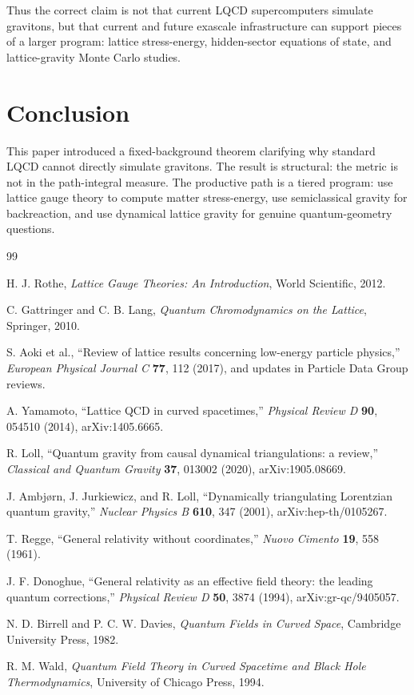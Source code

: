 \documentclass[11pt]{article}
\theoremstyle{remark}
\begin{document}
Thus the correct claim is not that current LQCD supercomputers simulate gravitons, but that current and future exascale infrastructure can support pieces of a larger program: lattice stress-energy, hidden-sector equations of state, and lattice-gravity Monte Carlo studies.

\section{Conclusion}

This paper introduced a fixed-background theorem clarifying why standard LQCD cannot directly simulate gravitons. The result is structural: the metric is not in the path-integral measure. The productive path is a tiered program: use lattice gauge theory to compute matter stress-energy, use semiclassical gravity for backreaction, and use dynamical lattice gravity for genuine quantum-geometry questions.

\begin{thebibliography}{99}

H. J. Rothe,
\textit{Lattice Gauge Theories: An Introduction}, World Scientific, 2012.

C. Gattringer and C. B. Lang,
\textit{Quantum Chromodynamics on the Lattice}, Springer, 2010.

S. Aoki et al.,
``Review of lattice results concerning low-energy particle physics,''
\textit{European Physical Journal C} \textbf{77}, 112 (2017), and updates in Particle Data Group reviews.

A. Yamamoto,
``Lattice QCD in curved spacetimes,''
\textit{Physical Review D} \textbf{90}, 054510 (2014), arXiv:1405.6665.

R. Loll,
``Quantum gravity from causal dynamical triangulations: a review,''
\textit{Classical and Quantum Gravity} \textbf{37}, 013002 (2020), arXiv:1905.08669.

J. Ambj\o rn, J. Jurkiewicz, and R. Loll,
``Dynamically triangulating Lorentzian quantum gravity,''
\textit{Nuclear Physics B} \textbf{610}, 347 (2001), arXiv:hep-th/0105267.

T. Regge,
``General relativity without coordinates,''
\textit{Nuovo Cimento} \textbf{19}, 558 (1961).

J. F. Donoghue,
``General relativity as an effective field theory: the leading quantum corrections,''
\textit{Physical Review D} \textbf{50}, 3874 (1994), arXiv:gr-qc/9405057.

N. D. Birrell and P. C. W. Davies,
\textit{Quantum Fields in Curved Space}, Cambridge University Press, 1982.

R. M. Wald,
\textit{Quantum Field Theory in Curved Spacetime and Black Hole Thermodynamics}, University of Chicago Press, 1994.

\end{thebibliography}
\end{document}

